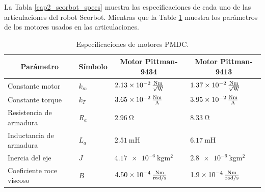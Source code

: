La Tabla \ref{cap2_scorbot_specs} muestra las especificaciones de cada uno de las articulaciones del robot Scorbot. Mientras que la Table \ref{cap2_scorbot_motor_specs} muestra los parámetros de los motores usados en las articulaciones.

\begin{table}[]
	\begin{tabular}{|l|l|l|l|}
		\hline
		\multicolumn{1}{|c|}{\textbf{Parámetro}} & \multicolumn{1}{|c|}{\textbf{Símbolo}} & \multicolumn{1}{c|}{\textbf{Motor Pittman-9434}}     & \multicolumn{1}{c|}{\textbf{Motor Pittman-9413}}     \\ \hline
		Constante motor           & $k_m$ & $\SI{2.13e-2}{\frac{\newton\metre}{\sqrt{\watt}}}$ & $\SI{1.37e-2}{\frac{\newton\metre}{\sqrt{\watt}}}$ \\ \hline
		Constante torque          & $k_T$ & $\SI{3.65e-2}{\frac{\newton\metre}{\ampere}}$ & $\SI{3.95e-2}{\frac{\newton\metre}{\ampere}}$ \\ \hline
		Resistencia de armadura   & $R_a$ & $\SI{2.96}{\ohm}$ & $\SI{8.33}{\ohm}$ \\ \hline
		Inductancia de armadura   & $L_a$ & $\SI{2.51}{\milli\henry}$ & $\SI{6.17}{\milli\henry}$ \\ \hline
		Inercia del eje           & $J$   & $\SI{4.17e-6}{\kilogram\metre^2}$ & $\SI{2.8e-6}{\kilogram\metre^2}$ \\ \hline
		Coeficiente roce viscoso  & $B$   & $\SI{4.50e-4}{\frac{\newton\metre}{\radian\per\second}}$ & $\SI{1.9e-4}{\frac{\newton\metre}{\radian\per\second}}$ \\ \hline
	\end{tabular}
	\caption{Especificaciones de motores PMDC.}
	\label{cap2_scorbot_motor_specs}
\end{table}


